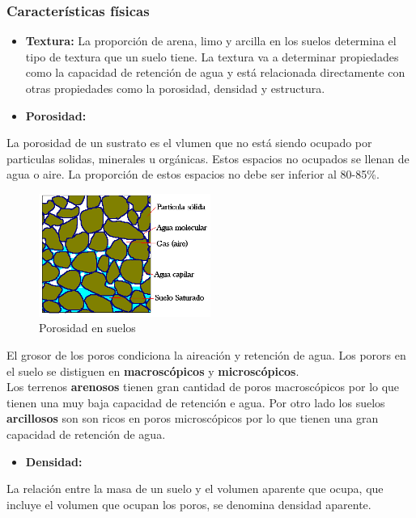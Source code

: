 \documentclass[a4paper,12pt,oneside]{article}
\begin{document}
\subsubsection{Características físicas}
\label{sec:org515513d}
\begin{itemize}
\item \textbf{Textura:} La proporción de arena, limo y arcilla en los suelos determina el
tipo de textura que un suelo tiene. La textura va a determinar propiedades
como la capacidad de retención de agua y está relacionada directamente con
otras propiedades como la porosidad, densidad y estructura.
\item \textbf{Porosidad:}
\end{itemize}
La porosidad de un sustrato es el vlumen que no está siendo ocupado por
particulas solidas, minerales u orgánicas. Estos espacios no ocupados se llenan
de agua o aire.
La proporción de estos espacios no debe ser inferior al 80-85\%.\\
\begin{center}
\begin{figure}[htbp]
\centering
\includegraphics[width=0.5\textwidth]{./img_uf1596/porosidad.PNG}
\caption{\label{fig:org46daf69}
Porosidad en suelos}
\end{figure}
\end{center}
El grosor de los poros condiciona la aireación y retención de agua. Los porors
en el suelo se distiguen en \textbf{macroscópicos} y \textbf{microscópicos}.\\
Los terrenos \textbf{arenosos} tienen gran cantidad de poros macroscópicos por lo que tienen una 
muy baja capacidad de retención e agua. Por otro lado los suelos \textbf{arcillosos}
son son ricos en poros microscópicos por lo que tienen una gran capacidad de
retención de agua.
\begin{itemize}
\item \textbf{Densidad:}
\end{itemize}
La relación entre la masa de un suelo y el volumen aparente que ocupa, que
incluye el volumen que ocupan los poros, se denomina densidad aparente.\\
\end{document}
